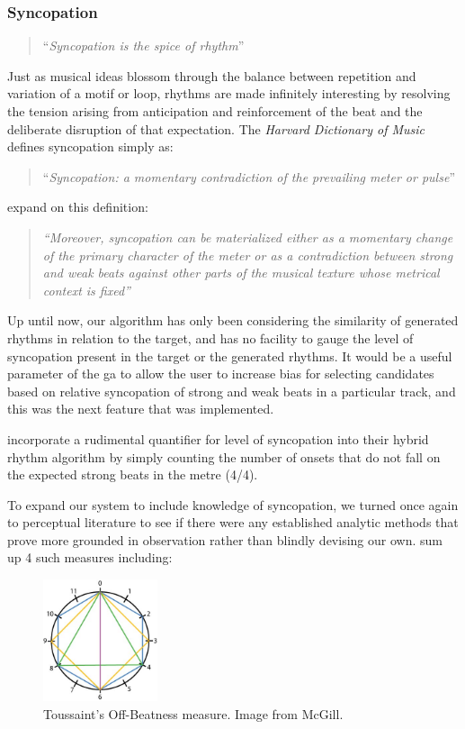 {{{\subsubsection{Syncopation}

\blockcquote[]{Toussaint2013}{``\textit{Syncopation is the spice of rhythm}''}

Just as musical ideas blossom through the balance between repetition and variation of a motif or loop, rhythms are made infinitely interesting by resolving the tension arising from anticipation and reinforcement of the beat and the deliberate disruption of that expectation. The \textit{Harvard Dictionary of Music} defines syncopation simply as:

\blockcquote[]{Apel1969}{``\textit{Syncopation: a momentary contradiction of the prevailing meter or pulse}''}

\cite{Gomez2005} expand on this definition:

\blockquote{\textit{``Moreover, syncopation can be materialized either as a momentary change of the primary character of the meter or as a contradiction between strong and weak beats against other parts of the musical texture whose metrical context is fixed''}}

Up until now, our algorithm has only been considering the similarity of generated rhythms in relation to the target, and has no facility to gauge the level of syncopation present in the target or the generated rhythms. It would be a useful parameter of the \acrshort{ga} to allow the user to increase bias for selecting candidates based on relative syncopation of strong and weak beats in a particular track, and this was the next feature that was implemented.

\cite{Eigenfeldt2013} incorporate a rudimental quantifier for level of syncopation into their hybrid rhythm algorithm by simply counting the number of onsets that do not fall on the expected strong beats in the metre (4/4).

To expand our system to include knowledge of syncopation, we turned once again to perceptual literature to see if there were any established analytic methods that prove more grounded in observation rather than blindly devising our own. \cite{Gomez2005} sum up 4 such measures including:

  \begin{figure}
	\begin{center}
		\includegraphics[width=0.3\textwidth]{ch03_symbolic/figures/offBeatness.jpg}
	\end{center}
	\caption[Toussaint's Off-Beatness measure]{Toussaint's Off-Beatness measure. Image from McGill.}
	\label{fig:offbeatness}
	\end{figure}
	
}}}
